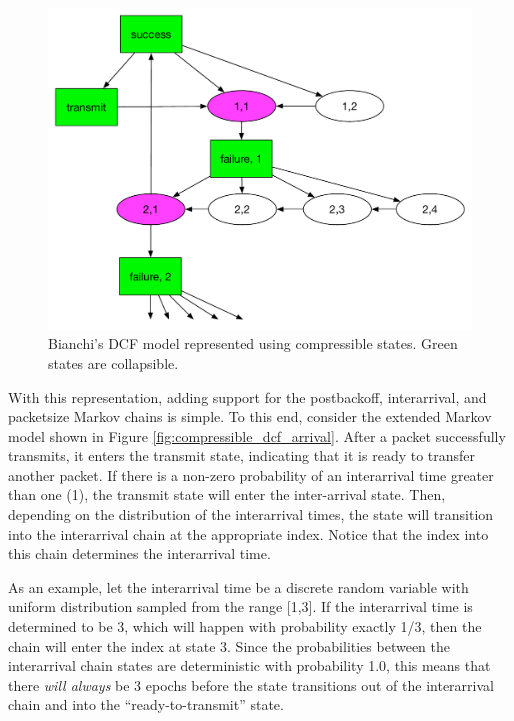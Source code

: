 \documentclass{llncs}
\begin{document}
\begin{figure}
\begin{center}
\includegraphics[scale=0.45]{../../sketches/compressible_dcf.pdf}
\caption{Bianchi's DCF model represented using compressible states. Green states are collapsible.}
\label{fig:compressible_dcf}
\end{center}
\end{figure}

With this representation, adding support for the postbackoff, interarrival, and packetsize Markov chains is simple. To this end, consider the extended Markov model shown in Figure \ref{fig:compressible_dcf_arrival}. After a packet successfully transmits, it enters the {\sf transmit} state, indicating that it is ready to transfer another packet. If there is a non-zero probability of an interarrival time greater than one (1), the transmit state will enter the {\sf inter-arrival} state. Then, depending on the distribution of the interarrival times, the state will transition into the interarrival chain at the appropriate index. Notice that the index into this chain determines the interarrival time. 

As an example, let the interarrival time be a discrete random variable with uniform distribution sampled from the range [1,3]. If the interarrival time is determined to be 3, which will happen with probability exactly 1/3, then the chain will enter the index at state 3. Since the probabilities between the interarrival chain states are deterministic with probability 1.0, this means that there \emph{will always} be 3 epochs before the state transitions out of the interarrival chain and into the ``ready-to-transmit'' state. 
\end{document}
